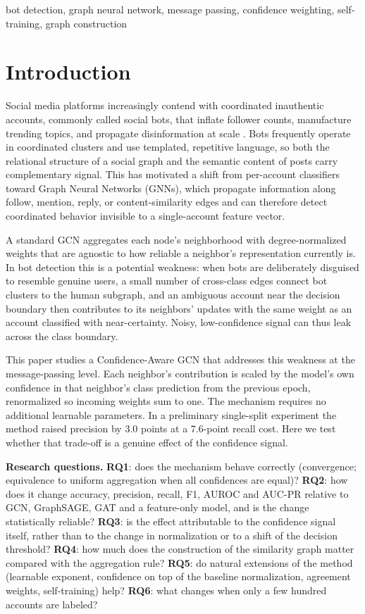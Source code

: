 \documentclass[conference]{IEEEtran}
\begin{document}
\begin{IEEEkeywords}
bot detection, graph neural network, message passing, confidence weighting, self-training, graph construction
\end{IEEEkeywords}

\section{Introduction}

Social media platforms increasingly contend with coordinated inauthentic accounts, commonly called social bots, that inflate follower counts, manufacture trending topics, and propagate disinformation at scale \cite{cresci2020decade}. Bots frequently operate in coordinated clusters and use templated, repetitive language, so both the relational structure of a social graph and the semantic content of posts carry complementary signal. This has motivated a shift from per-account classifiers toward Graph Neural Networks (GNNs), which propagate information along follow, mention, reply, or content-similarity edges and can therefore detect coordinated behavior invisible to a single-account feature vector.

A standard GCN \cite{kipf2017gcn} aggregates each node's neighborhood with degree-normalized weights that are agnostic to how reliable a neighbor's representation currently is. In bot detection this is a potential weakness: when bots are deliberately disguised to resemble genuine users, a small number of cross-class edges connect bot clusters to the human subgraph, and an ambiguous account near the decision boundary then contributes to its neighbors' updates with the same weight as an account classified with near-certainty. Noisy, low-confidence signal can thus leak across the class boundary.

This paper studies a Confidence-Aware GCN that addresses this weakness at the message-passing level. Each neighbor's contribution is scaled by the model's own confidence in that neighbor's class prediction from the previous epoch, renormalized so incoming weights sum to one. The mechanism requires no additional learnable parameters. In a preliminary single-split experiment the method raised precision by 3.0 points at a 7.6-point recall cost. Here we test whether that trade-off is a genuine effect of the confidence signal.

\textbf{Research questions.} \textbf{RQ1}: does the mechanism behave correctly (convergence; equivalence to uniform aggregation when all confidences are equal)? \textbf{RQ2}: how does it change accuracy, precision, recall, F1, AUROC and AUC-PR relative to GCN, GraphSAGE, GAT and a feature-only model, and is the change statistically reliable? \textbf{RQ3}: is the effect attributable to the confidence signal itself, rather than to the change in normalization or to a shift of the decision threshold? \textbf{RQ4}: how much does the construction of the similarity graph matter compared with the aggregation rule? \textbf{RQ5}: do natural extensions of the method (learnable exponent, confidence on top of the baseline normalization, agreement weights, self-training) help? \textbf{RQ6}: what changes when only a few hundred accounts are labeled?
\end{document}
